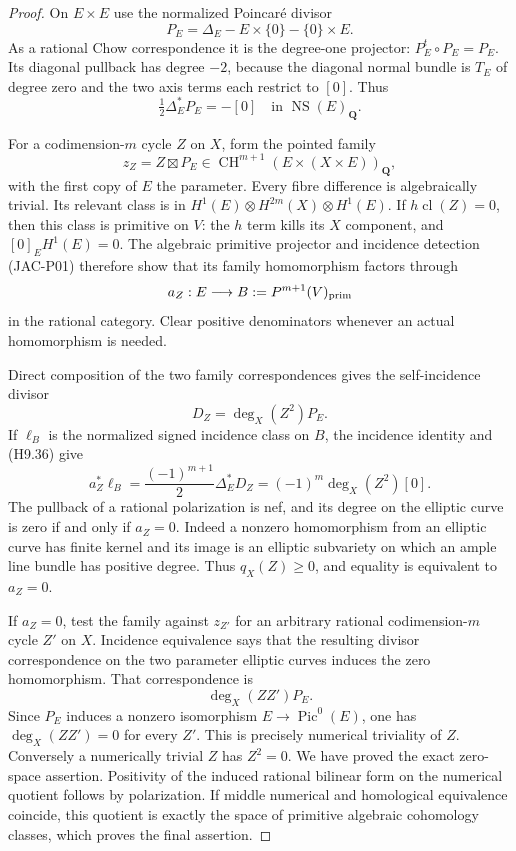 \begin{proof}
On $E\times E$ use the normalized Poincar\'e divisor
\[
 P_E=\Delta_E-E\times\{0\}-\{0\}\times E.
\]
As a rational Chow correspondence it is the degree-one projector:
$P_E^t\circ P_E=P_E$. Its diagonal pullback has degree $-2$,
because the diagonal normal bundle is $T_E$ of degree zero and the
two axis terms each restrict to $[0]$. Thus
\[
 \tfrac12\Delta_E^*P_E=-[0]
       \quad\text{in }\operatorname{NS}(E)_{\mathbf Q}.       \tag{H9.36}
\]

For a codimension-$m$ cycle $Z$ on $X$, form the pointed family
\[
 z_Z=Z\boxtimes P_E
    \in\operatorname{CH}^{m+1}(E\times(X\times E))_{\mathbf Q},
\]
with the first copy of $E$ the parameter. Every fibre difference is
algebraically trivial. Its relevant class is in
$H^1(E)\otimes H^{2m}(X)\otimes H^1(E)$.
If $h\operatorname{cl}(Z)=0$, then this class is primitive on $V$:
the $h$ term kills its $X$ component, and $[0]_E H^1(E)=0$.
The algebraic primitive projector and incidence detection (JAC-P01)
therefore show that its family homomorphism factors through
\[
 a_Z:E\longrightarrow B:=P^{m+1}(V)_{\rm prim}
\]
in the rational category. Clear positive denominators whenever an
actual homomorphism is needed.

Direct composition of the two family correspondences gives the
self-incidence divisor
\[
 D_Z=\deg_X(Z^2)P_E.
\]
If $\ell_B$ is the normalized signed incidence class on $B$, the
incidence identity and (H9.36) give
\[
 a_Z^*\ell_B
   =\frac{(-1)^{m+1}}2\Delta_E^*D_Z
   =(-1)^m\deg_X(Z^2)[0].                                  \tag{H9.37}
\]
The pullback of a rational polarization is nef, and its degree on
the elliptic curve is zero if and only if $a_Z=0$. Indeed a nonzero
homomorphism from an elliptic curve has finite kernel and its image
is an elliptic subvariety on which an ample line bundle has positive
degree. Thus $q_X(Z)\ge0$, and equality is equivalent to $a_Z=0$.

If $a_Z=0$, test the family against $z_{Z'}$ for an arbitrary rational
codimension-$m$ cycle $Z'$ on $X$. Incidence equivalence says that
the resulting divisor correspondence on the two parameter elliptic
curves induces the zero homomorphism. That correspondence is
\[
 \deg_X(ZZ')P_E.
\]
Since $P_E$ induces a nonzero isomorphism $E\to\operatorname{Pic}^0(E)$,
one has $\deg_X(ZZ')=0$ for every $Z'$. This is precisely numerical
triviality of $Z$. Conversely a numerically trivial $Z$ has $Z^2=0$.
We have proved the exact zero-space assertion. Positivity of the
induced rational bilinear form on the numerical quotient follows by
polarization. If middle numerical and homological equivalence coincide,
this quotient is exactly the space of primitive algebraic cohomology
classes, which proves the final assertion.
\end{proof}

